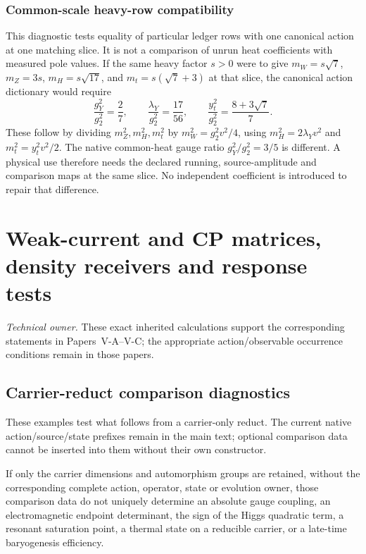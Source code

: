 \documentclass[11pt,a4paper]{article}
\begin{document}
\subsubsection{Common-scale heavy-row compatibility}
\label{p7:app:v179-heavy-row-compatibility}

This diagnostic tests equality of particular ledger rows with one
canonical action at one matching slice.  It is not a comparison of
unrun heat coefficients with measured pole values.
If the same heavy factor \(s>0\) were to give
\(m_W=s\sqrt7\), \(m_Z=3s\), \(m_H=s\sqrt{17}\), and
\(m_t=s(\sqrt7+3)\) at that slice, the canonical action dictionary would
require
\[
 \frac{g_Y^2}{g_2^2}=\frac27,\qquad
 \frac{\lambda_Y}{g_2^2}=\frac{17}{56},\qquad
 \frac{y_t^2}{g_2^2}=\frac{8+3\sqrt7}{7}.
\]
These follow by dividing \(m_Z^2,m_H^2,m_t^2\) by
\(m_W^2=g_2^2v^2/4\), using
\(m_H^2=2\lambda_Yv^2\) and \(m_t^2=y_t^2v^2/2\).
The native common-heat gauge ratio \(g_Y^2/g_2^2=3/5\) is different.
A physical use therefore needs the declared running, source-amplitude
and comparison maps at the same slice.  No independent coefficient is
introduced to repair that difference.

\begingroup
\footnotesize
\raggedright
\sloppy
\setlength{\emergencystretch}{8em}
\setlength{\hfuzz}{1pt}
\endgroup


\section{Weak-current and CP matrices, density receivers and response tests}
\label{p5d:sec:F}
\noindent\textit{Technical owner.} These exact inherited calculations
support the corresponding statements in Papers~V-A--V-C;
the appropriate action/observable occurrence conditions remain in those papers.
\subsection{Carrier-reduct comparison diagnostics}
\label{p5c:app:v2187-carrier-comparison-scope}
These examples test what follows from a carrier-only reduct.  The current
native action/source/state prefixes remain in the main text; optional
comparison data cannot be inserted into them without their own constructor.

\begin{theorem}
\label{p7v2:thm:type-separation}
If only the carrier dimensions and automorphism groups are retained, without
the corresponding complete action, operator, state or evolution owner, those
comparison data do not uniquely determine an absolute gauge coupling, an electromagnetic endpoint
determinant, the sign of the Higgs quadratic term, a resonant saturation point,
a thermal state on a reducible carrier, or a late-time baryogenesis efficiency.
\end{theorem}
\end{document}
